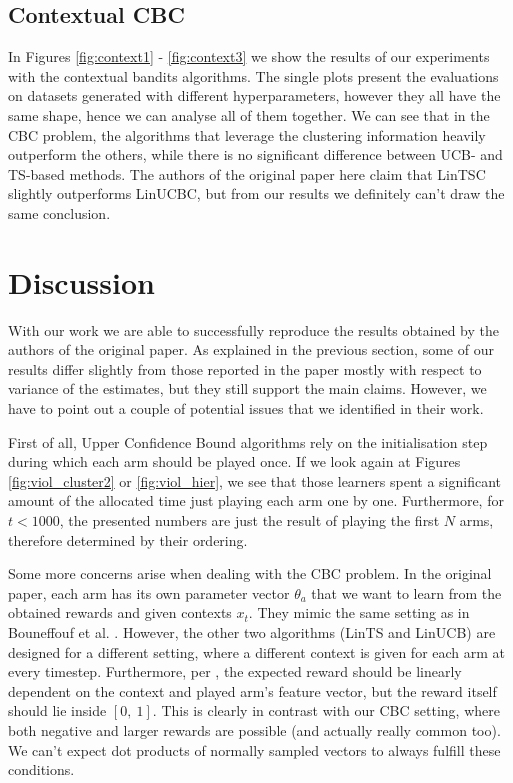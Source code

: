 \subsection{Contextual CBC}

In Figures \ref{fig:context1} - \ref{fig:context3} we show the results of our experiments with the contextual bandits algorithms. The single plots present the evaluations on datasets generated with different hyperparameters, however they all have the same shape, hence we can analyse all of them together. We can see that in the CBC problem, the algorithms that leverage the clustering information heavily outperform the others, while there is no significant difference between UCB- and TS-based methods. The authors of the original paper here claim that LinTSC slightly outperforms LinUCBC, but from our results we definitely can't draw the same conclusion.

\section{Discussion}

With our work we are able to successfully reproduce the results obtained by the authors of the original paper. As explained in the previous section, some of our results differ slightly from those reported in the paper mostly with respect to variance of the estimates, but they still support the main claims. However, we have to point out a couple of potential issues that we identified in their work. 

First of all, Upper Confidence Bound algorithms rely on the initialisation step during which each arm should be played once. If we look again at Figures \ref{fig:viol_cluster2} or \ref{fig:viol_hier}, we see that those learners spent a significant amount of the allocated time just playing each arm one by one. Furthermore, for $t < 1000$, the presented numbers are just the result of playing the first $N$ arms, therefore determined by their ordering.

Some more concerns arise when dealing with the CBC problem. In the original paper, each arm has its own parameter vector $\theta_a$ that we want to learn from the obtained rewards and given contexts $x_t$. They mimic the same setting as in Bouneffouf et al. \cite{bouneffouf}. However, the other two algorithms (LinTS and LinUCB) are designed for a different setting, where a different context is given for each arm at every timestep. Furthermore, per \cite{bouneffouf}, the expected reward should be linearly dependent on the context and played arm's feature vector, but the reward itself should lie inside $[0,\ 1]$. This is clearly in contrast with our CBC setting, where both negative and larger rewards are possible (and actually really common too). We can't expect dot products of normally sampled vectors to always fulfill these conditions.

